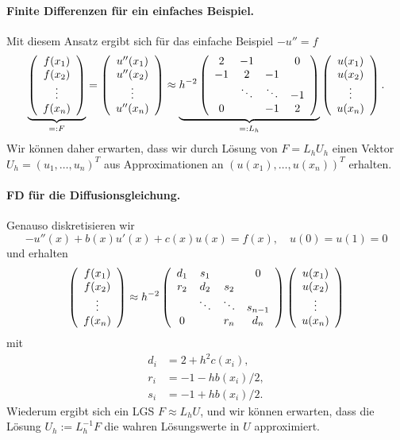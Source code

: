 \documentclass[
]{mycourse}
\theoremstyle{mythm}
\theoremstyle{break}
\begin{document}
\paragraph{Finite Differenzen für ein einfaches Beispiel.}
Mit diesem Ansatz ergibt sich für das einfache Beispiel $-u''=f$ 
\[
\underbrace{\left( \begin{array}{c} f(x_1)\\ f(x_2)\\ \vdots \\ f(x_{n}) \end{array}\right)}_{=:F}
= \left( \begin{array}{c} u''(x_1)\\ u''(x_2)\\ \vdots \\ u''(x_{n}) \end{array}\right)
\approx \underbrace{h^{-2} \left( \begin{array}{c c c c} 2 & -1 &  & 0\\ -1 & 2 & -1 \\ & \ddots & \ddots & -1\\ 0 & & -1 & 2\end{array}\right)}_{=:L_h}
\left( \begin{array}{c} u(x_1)\\ u(x_2)\\ \vdots \\ u(x_{n}) \end{array}\right).
\]
Wir können daher erwarten, dass wir durch Lösung von $F=L_h U_h$ einen
Vektor $U_h=(u_1,\ldots,u_{n})^T$ aus Approximationen an $(u(x_1),\ldots,u(x_{n}))^T$
erhalten.

\paragraph{FD für die Diffusionsgleichung.}
Genauso diskretisieren wir
\[
-u''(x) + b(x)u'(x) + c(x)u(x)=f(x), \quad u(0)=u(1)=0
\]
und erhalten
\[
\left( \begin{array}{c} f(x_1)\\ f(x_2)\\ \vdots \\ f(x_{n}) \end{array}\right)
\approx h^{-2} \left( \begin{array}{c c c c} d_1 & s_1 &  & 0\\ r_2 & d_2 & s_2 \\ & \ddots & \ddots & s_{n-1}\\ 0  &  & r_{n} & d_{n}\end{array}\right) 
\left( \begin{array}{c} u(x_1)\\ u(x_2)\\ \vdots \\ u(x_{n}) \end{array}\right)
\]
mit
\begin{align*}
d_i&=2+h^2 c(x_i),\\
r_i&=-1-hb(x_i)/2,\\
s_i&=-1+hb(x_i)/2.
\end{align*}
Wiederum ergibt sich ein LGS $F\approx L_h U$, und wir können erwarten, dass die
Lösung $U_h:=L_h^{-1} F$ die wahren Lösungswerte in $U$ approximiert.
\end{document}
